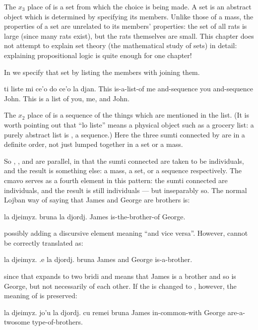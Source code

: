 The $x_3$ place of  is a set from which the choice is
    being made. A set is an abstract object which is determined by
    specifying its members. Unlike those of a mass, the properties
    of a set are unrelated to its members' properties: the set of
    all rats is large (since many rats exist), but the rats
    themselves are small. This chapter does not attempt to explain
    set theory (the mathematical study of sets) in detail:
    explaining propositional logic is quite enough for one chapter!

In  we specify that set by
    listing the members with  joining them.
\begin{example}
ti liste mi ce'o do ce'o la djan.\n
This is-a-list-of me and-sequence you and-sequence John.\n
This is a list of you, me, and John.
\end{example}

The $x_2$ place of  is a sequence of the things which are
    mentioned in the list. (It is worth pointing out that ``lo
    liste'' means a physical object such as a grocery list: a
    purely abstract list is , a sequence.) Here the
    three sumti connected by  are in a definite order, not
    just lumped together in a set or a mass. 

So , , and  are parallel, in that the
    sumti connected are taken to be individuals, and the result is
    something else: a mass, a set, or a sequence respectively. The
    cmavo  serves as a fourth element in this pattern: the
    sumti connected are individuals, and the result is still
    individuals --- but inseparably so. The normal Lojban way of
    saying that James and George are brothers is:
\begin{example}
la djeimyz. bruna la djordj.\n
James is-the-brother-of George.
\end{example}

{\noindent}possibly adding a discursive element meaning ``and vice
    versa''. However,  cannot be
    correctly translated as:
\begin{example}
la djeimyz. .e la djordj. bruna\n
James and George is-a-brother.
\end{example}

{\noindent}since that expands to two bridi and means that James is a
    brother and so is George, but not necessarily of each other. If
    the  is changed to , however, the meaning of  is preserved:
\begin{example}
la djeimyz. jo'u la djordj.\n
\T	cu remei bruna\n
James in-common-with George\n
\T	are-a-twosome type-of-brothers.
\end{example}


